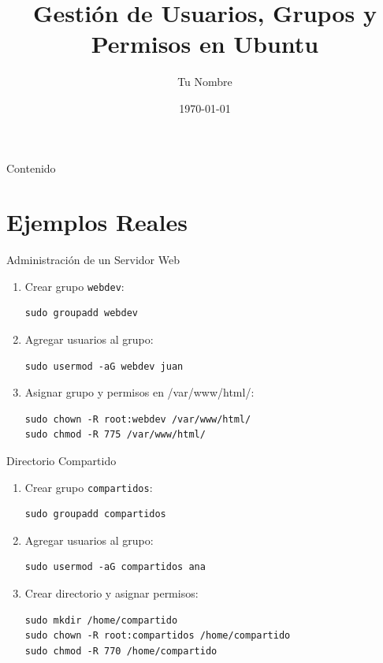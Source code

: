 \documentclass{beamer}
\title{Gestión de Usuarios, Grupos y Permisos en Ubuntu}
\author{Tu Nombre}
\date{\today}
\begin{document}
\begin{frame}
    \titlepage
\end{frame}

\begin{frame}{Contenido}
    \tableofcontents
\end{frame}

\section{Ejemplos Reales}

\begin{frame}[fragile]{Administración de un Servidor Web}
    \begin{enumerate}
        \item Crear grupo \texttt{webdev}:
        \begin{lstlisting}
sudo groupadd webdev
        \end{lstlisting}
        \item Agregar usuarios al grupo:
        \begin{lstlisting}
sudo usermod -aG webdev juan
        \end{lstlisting}
        \item Asignar grupo y permisos en /var/www/html/:
        \begin{lstlisting}
sudo chown -R root:webdev /var/www/html/
sudo chmod -R 775 /var/www/html/
        \end{lstlisting}
    \end{enumerate}
\end{frame}

\begin{frame}{Directorio Compartido}
    \begin{enumerate}
        \item Crear grupo \texttt{compartidos}:
        \begin{lstlisting}
sudo groupadd compartidos
        \end{lstlisting}
        \item Agregar usuarios al grupo:
        \begin{lstlisting}
sudo usermod -aG compartidos ana
        \end{lstlisting}
        \item Crear directorio y asignar permisos:
        \begin{lstlisting}
sudo mkdir /home/compartido
sudo chown -R root:compartidos /home/compartido
sudo chmod -R 770 /home/compartido
        \end{lstlisting}
    \end{enumerate}
\end{frame}
\end{document}
